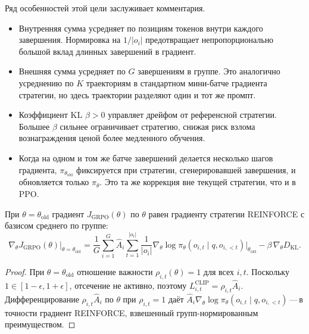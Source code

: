 Ряд особенностей этой цели заслуживает комментария.

\begin{itemize}[leftmargin=*]
\item Внутренняя сумма усредняет по позициям токенов внутри каждого завершения. Нормировка на $1/|o_i|$ предотвращает непропорционально большой вклад длинных завершений в градиент.
\item Внешняя сумма усредняет по $G$ завершениям в группе. Это аналогично усреднению по $K$ траекториям в стандартном мини-батче градиента стратегии, но здесь траектории разделяют один и тот же промпт.
\item Коэффициент KL $\beta > 0$ управляет дрейфом от референсной стратегии. Большее $\beta$ сильнее ограничивает стратегию, снижая риск взлома вознаграждения ценой более медленного обучения.
\item Когда на одном и том же батче завершений делается несколько шагов градиента, $\pi_{\theta_\mathrm{old}}$ фиксируется при стратегии, сгенерировавшей завершения, и обновляется только $\pi_\theta$. Это та же коррекция вне текущей стратегии, что и в PPO.
\end{itemize}

\begin{proposition}
\label{prop:grpo-local-gradient}
При $\theta = \theta_\mathrm{old}$ градиент $J_{\mathrm{GRPO}}(\theta)$ по $\theta$ равен градиенту стратегии REINFORCE с базисом среднего по группе:
\begin{equation}
\label{eq:grpo-local-grad}
\nabla_\theta J_{\mathrm{GRPO}}(\theta)\big|_{\theta = \theta_\mathrm{old}}
= \frac{1}{G}\sum_{i=1}^G \hat{A}_i \sum_{t=1}^{|o_i|} \frac{1}{|o_i|}\nabla_\theta \log \pi_\theta(o_{i,t} \mid q, o_{i,<t})\Big|_{\theta_\mathrm{old}}
- \beta\,\nabla_\theta D_{\mathrm{KL}}.
\end{equation}
\end{proposition}

\begin{proof}
При $\theta = \theta_\mathrm{old}$ отношение важности $\rho_{i,t}(\theta) = 1$ для всех $i, t$. Поскольку $1 \in [1-\epsilon, 1+\epsilon]$, отсечение не активно, поэтому $L_{i,t}^{\mathrm{CLIP}} = \rho_{i,t}\hat{A}_i$. Дифференцирование $\rho_{i,t}\hat{A}_i$ по $\theta$ при $\rho_{i,t} = 1$ даёт $\hat{A}_i \nabla_\theta \log \pi_\theta(o_{i,t} \mid q, o_{i,<t})$\,---\,в точности градиент REINFORCE, взвешенный групп-нормированным преимуществом.
\end{proof}

